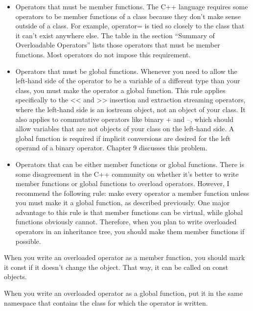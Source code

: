 \begin{itemize}
\item
Operators that must be member functions. The C++ language requires some operators to be member functions of a class because they don’t make sense outside of a class. For example, operator= is tied so closely to the class that it can’t exist anywhere else. The table in the section “Summary of Overloadable Operators” lists those operators that must be member functions. Most operators do not impose this requirement.

\item
Operators that must be global functions. Whenever you need to allow the left-hand side of the operator to be a variable of a different type than your class, you must make the operator a global function. This rule applies specifically to the <{}< and >{}> insertion and extraction streaming operators, where the left-hand side is an iostream object, not an object of your class. It also applies to commutative operators like binary + and –, which should allow variables that are not objects of your class on the left-hand side. A global function is required if implicit conversions are desired for the left operand of a binary operator. Chapter 9 discusses this problem.

\item
Operators that can be either member functions or global functions. There is some disagreement in the C++ community on whether it’s better to write member functions or global functions to overload operators. However, I recommend the following rule: make every operator a member function unless you must make it a global function, as described previously.
One major advantage to this rule is that member functions can be virtual, while global functions obviously cannot. Therefore, when you plan to write overloaded operators in an inheritance tree, you should make them member functions if possible.
\end{itemize}

When you write an overloaded operator as a member function, you should mark it const if it doesn’t change the object. That way, it can be called on const objects.

When you write an overloaded operator as a global function, put it in the same namespace that contains the class for which the operator is written.


